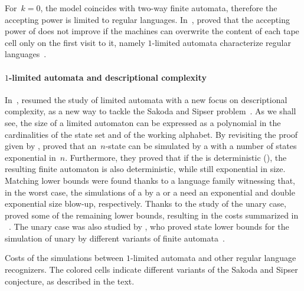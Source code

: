 For~$k=0$, the model coincides with two-way finite automata, therefore the accepting power is limited to regular languages.
In~\citeyear{WagWec86}, \citeauthor{WagWec86} proved that the accepting power of \TNFAs does not improve if the machines can overwrite the content of each tape cell only on the first visit to it, namely $1$-limited automata characterize regular languages~\cite{WagWec86}.

\paragraph{$1$-limited automata and descriptional complexity}
In~\citeyear{PigPis14}, \citeauthor{PigPis14} resumed the study of limited automata with a new focus on descriptional complexity, as a new way to tackle the Sakoda and Sipser problem~\cite{PigPis14}.
As we shall see, the size of a limited automaton can be expressed as a polynomial in the cardinalities of the state set and of the working alphabet.
By revisiting the proof given by \citeauthor{WagWec86}, \citeauthor{PigPis14} proved that an~$n$-state \OLA can be simulated by a \ONFA with a number of states exponential in~$n$.
Furthermore, they proved that if the \OLA is deterministic (\ODLA), the resulting finite automaton is also deterministic, while still exponential in size.
Matching lower bounds were found thanks to a language family witnessing that, in the worst case, the simulations of a \OLA by a \ONFA or a \ODFA need an exponential and double exponential size blow-up, respectively.
Thanks to the study of the unary case, \citeauthor{PigPri19} proved some of the remaining lower bounds, resulting in the costs summarized in ~\cite{PigPri19}.
The unary case was also studied by \citeauthor{KutWen15}, who proved state lower bounds for the simulation of unary \kLA by different variants of finite automata~\cite{KutWen15}.

\begin{table}
	\centering
	\caption[Costs of the simulations between $1$-limited automata and other regular language recognizers.]{Costs of the simulations between $1$-limited automata and other regular language recognizers.
		The colored cells indicate different variants of the Sakoda and Sipser conjecture, as described in the text.}
	\label{tab:sims-1la-general-context}
\end{table}

